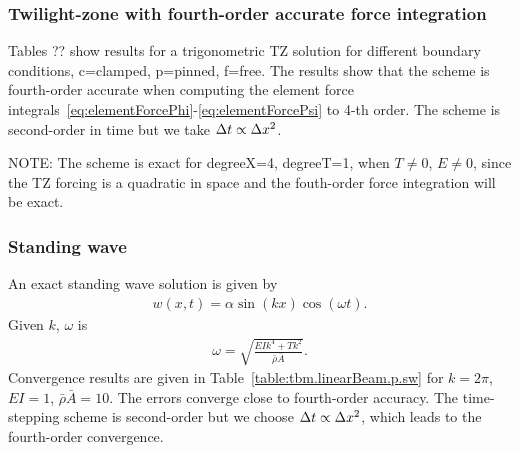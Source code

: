 \documentclass[11pt]{article}
\newcommand{\dt}{{\Delta t}}
\newcommand{\rhos}{\bar{\rho}}
\newcommand{\As}{\bar{A}}
\begin{document}
{
 
 
 
}


\subsubsection{Twilight-zone with fourth-order accurate force integration} 

Tables ?? show results for a trigonometric TZ solution for different boundary conditions, c=clamped, p=pinned, f=free.
The results show that the scheme is fourth-order accurate when computing the
element
force integrals~\eqref{eq:elementForcePhi}-\eqref{eq:elementForcePsi} to 4-th order.
The scheme is second-order in time but we take $\dt \propto \dx^2$. 

NOTE: The scheme is exact for degreeX=4, degreeT=1, when $T \ne 0$, $E\ne 0$, since the TZ forcing is a quadratic in space
and the fouth-order force integration will be exact.

{



}


\clearpage
\subsubsection{Standing wave} 

An exact standing wave solution is given by
\begin{align*}
   w(x,t) = \alpha \sin(k x)\cos(\omega t) .
\end{align*}
Given $k$, $\omega$ is 
\begin{align*}
   \omega =\sqrt{ \frac{E I k^4 + T k^2}{\rhos\As} } .
\end{align*}
Convergence results are given in Table~\ref{table:tbm.linearBeam.p.sw} for $k=2\pi$, $E I=1$, $\rhos\As=10$.
The errors converge close to fourth-order accuracy. The time-stepping scheme is second-order but 
we choose $\dt \propto \dx^2$, which leads to the fourth-order convergence.





%
%
\end{document}
